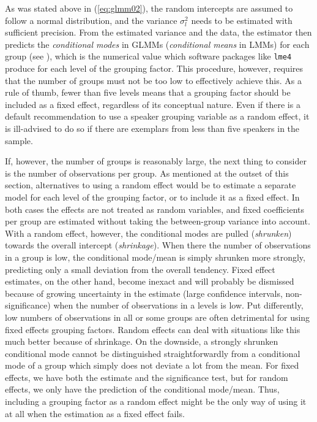 \documentclass[a4paper,12pt]{article}
\begin{document}
As was stated above in (\ref{eq:glmm02}), the random intercepts are assumed to follow a normal distribution, and the variance $\sigma_l^2$ needs to be estimated with sufficient precision.
From the estimated variance and the data, the estimator then predicts the \textit{conditional modes} in GLMMs (\textit{conditional means} in LMMs) for each group (see \citealt[Ch.~1]{Bates2010}), which is the numerical value which software packages like \texttt{lme4} produce for each level of the grouping factor.
This procedure, however, requires that the number of groups must not be too low to effectively achieve this.
As a rule of thumb, fewer than five levels means that a grouping factor should be included as a fixed effect, regardless of its conceptual nature.
Even if there is a default recommendation to use a speaker grouping variable as a random effect, it is ill-advised to do so if there are exemplars from less than five speakers in the sample.

If, however, the number of groups is reasonably large, the next thing to consider is the number of observations per group.
As mentioned at the outset of this section, alternatives to using a random effect would be to estimate a separate model for each level of the grouping factor, or to include it as a fixed effect.
In both cases the effects are not treated as random variables, and fixed coefficients per group are estimated without taking the between-group variance into account.
With a random effect, however, the conditional modes are pulled (\textit{shrunken}) towards the overall intercept (\textit{shrinkage}).
When there the number of observations in a group is low, the conditional mode\slash mean is simply shrunken more strongly, predicting only a small deviation from the overall tendency.
Fixed effect estimates, on the other hand, become inexact and will probably be dismissed because of growing uncertainty in the estimate (large confidence intervals, non-significance) when the number of observations in a levels is low.
Put differently, low numbers of observations in all or some groups are often detrimental for using fixed effects grouping factors.
Random effects can deal with situations like this much better because of shrinkage.
On the downside, a strongly shrunken conditional mode cannot be distinguished straightforwardly from a conditional mode of a group which simply does not deviate a lot from the mean.
For fixed effects, we have both the estimate and the significance test, but for random effects, we only have the prediction of the conditional mode\slash mean.
Thus, including a grouping factor as a random effect might be the only way of using it at all when the estimation as a fixed effect fails.
\end{document}
